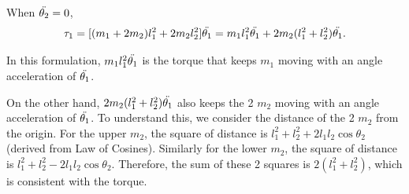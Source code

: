 \documentclass[
  course = {{16-811 Math Fundamentals for Robotics}},
  quartile = {{1}},
  assignment = 5,
  name = {{Kangle Deng}},
  email = {{kangled@andrew.cmu.edu}},
  firstexercise = 1
]{aga-homework}
\begin{document}
\subexercise

When $\Ddot{\theta_2} = 0$,
\begin{equation*}
    \tau_1 = [(m_1+2m_2)l_1^2+2m_2l_2^2]\Ddot{\theta_1} = m_1l_1^2\Ddot{\theta_1} + 2m_2(l_1^2+l_2^2)\Ddot{\theta_1}.
\end{equation*}

In this formulation, $m_1l_1^2\Ddot{\theta_1}$ is the torque that keeps $m_1$ moving with an angle acceleration of $\Ddot{\theta_1}$.

On the other hand, $2m_2(l_1^2+l_2^2)\Ddot{\theta_1}$ also keeps the 2 $m_2$ moving with an angle acceleration of $\Ddot{\theta_1}$. To understand this, we consider the distance of the 2 $m_2$ from the origin. For the upper $m_2$, the square of distance is $l_1^2+l_2^2+2l_1l_2\cos \theta_2$ (derived from Law of Cosines). Similarly for the lower $m_2$, the square of distance is $l_1^2+l_2^2-2l_1l_2\cos \theta_2$. Therefore, the sum of these 2 squares is $2(l_1^2+l_2^2)$, which is consistent with the torque.
\end{document}
